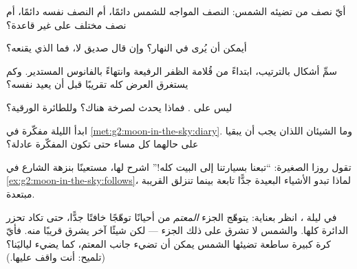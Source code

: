 \begin{exercise}[$\star$]\label{exo:g2:moon-in-the-sky:4}
أيّ نصف من  تضيئه الشمس: النصف المواجه للشمس دائمًا، أم
النصف نفسه دائمًا، أم نصف مختلف على غير قاعدة؟
\end{exercise}

\begin{exercise}[$\star$]\label{exo:g2:moon-in-the-sky:5}
أيمكن أن يُرى  في النهار؟ وإن قال صديق لا، فما الذي يقنعه؟
\end{exercise}

\begin{exercise}[$\star$]\label{exo:g2:moon-in-the-sky:6}
سمِّ أشكال  بالترتيب، ابتداءً من قُلامة الظفر الرفيعة
وانتهاءً بالفانوس المستدير. وكم يستغرق العرض كله تقريبًا قبل أن
يعيد نفسه؟
\end{exercise}

\begin{exercise}[$\star$]\label{exo:g2:moon-in-the-sky:7}
ليس على  . فماذا يحدث لصرخة هناك؟ وللطائرة الورقية؟
\end{exercise}

\begin{exercise}[$\star$]\label{exo:g2:moon-in-the-sky:8}
ابدأ الليلة مفكّرة  في \cref{met:g2:moon-in-the-sky:diary}.
وما الشيئان اللذان يجب أن يبقيا على حالهما كل مساء حتى تكون
المفكّرة عادلة؟
\end{exercise}

\begin{exercise}[$\star\star$]\label{exo:g2:moon-in-the-sky:9}
تقول روزا الصغيرة: ``تبعنا  بسيارتنا إلى البيت كله!'' اشرح
لها، مستعينًا بنزهة الشارع في
\cref{ex:g2:moon-in-the-sky:follows}، لماذا تبدو الأشياء البعيدة
جدًّا تابعة بينما تنزلق القريبة مبتعدة.
\end{exercise}

\begin{exercise}[$\star\star$]\label{exo:g2:moon-in-the-sky:10}
في ليلة ، انظر بعناية: يتوهّج الجزء \emph{المعتم} من 
أحيانًا توهّجًا خافتًا جدًّا، حتى تكاد تحزر الدائرة كلها. والشمس
لا تشرق على ذلك الجزء --- لكن شيئًا آخر يشرق قريبًا منه. فأيّ
كرة كبيرة ساطعة تضيئها الشمس يمكن أن تضيء جانب  المعتم، كما
يضيء  لياليَنا؟ (تلميح: أنت واقف عليها.)
\end{exercise}
